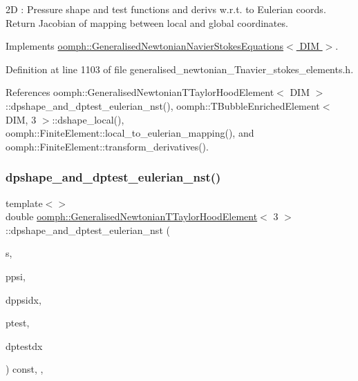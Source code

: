 2D \+: Pressure shape and test functions and derivs w.\+r.\+t. to Eulerian coords. Return Jacobian of mapping between local and global coordinates. 

Implements \hyperlink{classoomph_1_1GeneralisedNewtonianNavierStokesEquations_a00027d27dfdf3c0b72b0d1df9addfdc8}{oomph\+::\+Generalised\+Newtonian\+Navier\+Stokes\+Equations$<$ D\+I\+M $>$}.



Definition at line 1103 of file generalised\+\_\+newtonian\+\_\+\+Tnavier\+\_\+stokes\+\_\+elements.\+h.



References oomph\+::\+Generalised\+Newtonian\+T\+Taylor\+Hood\+Element$<$ D\+I\+M $>$\+::dpshape\+\_\+and\+\_\+dptest\+\_\+eulerian\+\_\+nst(), oomph\+::\+T\+Bubble\+Enriched\+Element$<$ D\+I\+M, 3 $>$\+::dshape\+\_\+local(), oomph\+::\+Finite\+Element\+::local\+\_\+to\+\_\+eulerian\+\_\+mapping(), and oomph\+::\+Finite\+Element\+::transform\+\_\+derivatives().

\mbox{\label{classoomph_1_1GeneralisedNewtonianTTaylorHoodElement_a18bf030630c7c0a90f62c809aa253684}} 
\subsubsection{\texorpdfstring{dpshape\+\_\+and\+\_\+dptest\+\_\+eulerian\+\_\+nst()}{dpshape\_and\_dptest\_eulerian\_nst()}\hspace{0.1cm}{\footnotesize\ttfamily [3/3]}}
{\footnotesize\ttfamily template$<$$>$ \\
double \hyperlink{classoomph_1_1GeneralisedNewtonianTTaylorHoodElement}{oomph\+::\+Generalised\+Newtonian\+T\+Taylor\+Hood\+Element}$<$ 3 $>$\+::dpshape\+\_\+and\+\_\+dptest\+\_\+eulerian\+\_\+nst (\begin{DoxyParamCaption}\item[{const \hyperlink{classoomph_1_1Vector}{Vector}$<$ double $>$ \&}]{s,  }\item[{\hyperlink{classoomph_1_1Shape}{Shape} \&}]{ppsi,  }\item[{\hyperlink{classoomph_1_1DShape}{D\+Shape} \&}]{dppsidx,  }\item[{\hyperlink{classoomph_1_1Shape}{Shape} \&}]{ptest,  }\item[{\hyperlink{classoomph_1_1DShape}{D\+Shape} \&}]{dptestdx }\end{DoxyParamCaption}) const\hspace{0.3cm}{\ttfamily [inline]}, {\ttfamily [protected]}, {\ttfamily [virtual]}}

